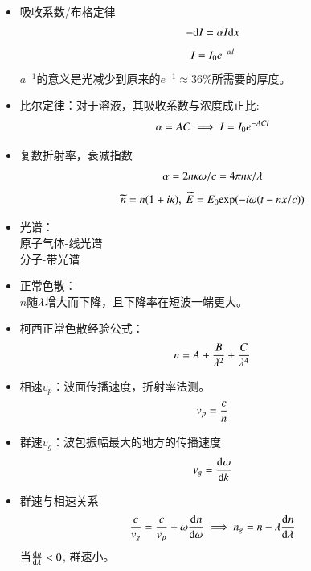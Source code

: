 \documentclass[UTF8,8pt]{ctexart}
\begin{document}
\begin{multicols}{3}
\begin{itemize}
$${}$$
\end{itemize}
\begin{itemize}
    \item 吸收系数/布格定律
    $$-\mathrm{d} I=\alpha I\mathrm{d} x$$
    $$I=I_0e^{-\alpha l}$$
    $a^{-1}$的意义是光减少到原来的$e^{-1} \approx 36\%$所需要的厚度。
    \item 比尔定律：对于溶液，其吸收系数与浓度成正比:
    $$\alpha=AC \implies I=I_0e^{-ACl}$$
    \item 复数折射率，衰减指数
    $$\alpha=2n\kappa\omega /c=4\pi n\kappa /\lambda$$
    $$\widetilde{n}=n(1+i\kappa),\ \widetilde{E}=E_0\exp(-i\o(t-nx/c))$$
    \item 光谱：\\
    原子气体-线光谱\\
    分子-带光谱
    \item 正常色散：\\
    $n$随$\lambda$增大而下降，且下降率在短波一端更大。
    \item 柯西正常色散经验公式：
    $$n=A+\frac{B}{\lambda^2}+\frac{C}{\lambda^4}$$
    \item 相速$v_p$：波面传播速度，折射率法测。
    $$v_p=\frac{c}{n}$$
    \item 群速$v_g$：波包振幅最大的地方的传播速度
    $$v_g=\frac{\mathrm{d}^{} \omega}{\mathrm{d} k^{}}$$
    \item 群速与相速关系
    $$\frac{c}{v_g}=\frac{c}{v_p}+\omega\frac{\mathrm{d}^{} n}{\mathrm{d} \omega^{}} \implies n_g=n-\lambda\frac{\mathrm{d}^{} n}{\mathrm{d} \lambda^{}}$$
    当$\frac{\mathrm{d}^{} n}{\mathrm{d} \lambda^{}}<0$, 群速小。
\end{itemize}
\end{multicols}
\end{document}
